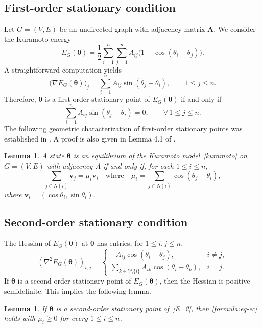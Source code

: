 \documentclass[11pt,reqno]{amsart}
\newtheorem{lemma}[theorem]{Lemma}
\theoremstyle{definition}
\begin{document}
\subsection{First-order stationary condition}
Let $G=(V,E)$ be an undirected graph with adjacency matrix $\boldsymbol A$.
We consider the Kuramoto energy
\[
 E_G(\boldsymbol\theta)
=
\frac12 \sum_{i=1}^n \sum_{j=1}^n  A_{ij}\bigl(1-\cos(\theta_i-\theta_j)\bigr).
\]
A straightforward computation yields
\[
\bigl(\nabla E_G(\boldsymbol\theta)\bigr)_j
=
\sum_{i=1}^n A_{ij}\sin(\theta_j-\theta_i),
\qquad 1 \le j \le n .
\]
Therefore, $\boldsymbol \theta$ is a first-order stationary point of $ E_G(\boldsymbol\theta)$ if and only if
\[
\sum_{i=1}^n A_{ij}\sin(\theta_j-\theta_i)=0,
\qquad \forall\, 1 \le j \le n.
\]
The following geometric characterization of first-order stationary points was established in \cite{monzon2005global}. A proof is also given in Lemma 4.1 of \cite{wu2025threshold}.
\begin{lemma}\label{eq-vec}
A state \( \boldsymbol \theta \) is an equilibrium of the Kuramoto model~\eqref{kuramoto} on $G=(V,E)$ with adjacency $A$ {if and only if}, for each \( 1 \le i \le n\),
\begin{equation}\label{formula:eq-ec}
\sum_{j\in N(i)} \boldsymbol v_j = \mu_i \boldsymbol v_i\quad\text{where}\quad \mu_i=\sum_{j\in N(i)}\cos(\theta_j-\theta_i),
\end{equation}
where $\boldsymbol v_i=(\cos\theta_i,\sin\theta_i)$.
\end{lemma}

\subsection{Second-order stationary condition}
The Hessian of $E_G(\boldsymbol{\theta})$ at $\boldsymbol{\theta}$ has entries, for $1 \le i,j \le n$,
\[
(\nabla^2 E_G(\boldsymbol{\theta}))_{i,j}
=
\begin{cases}
-A_{ij}\cos(\theta_i-\theta_j), & i\neq j,\\[1mm]
\displaystyle\sum_{k\in V\setminus\{i\}}
A_{ik}\cos(\theta_i-\theta_k), & i=j.
\end{cases}
\]
If $\boldsymbol\theta$ is a second-order stationary point of $E_G(\boldsymbol\theta)$, then the Hessian is
positive semidefinite. This implies the following lemma.

\begin{lemma}\label{stable-eq}
If $\boldsymbol{\theta}$ is a second-order stationary point of~\eqref{E_2},
then \eqref{formula:eq-ec} holds with $\mu_i\ge 0$ for every $1\le i\le n$.
\end{lemma}
\end{document}
